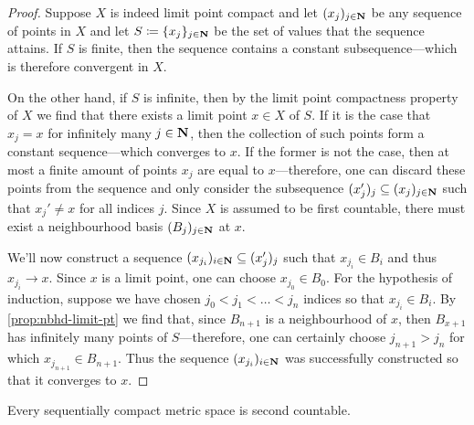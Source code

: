 \begin{proof}
    Suppose \(X\) is indeed limit point compact and let \((x_j)_{j \in \mathbf{N}}\) be any
    sequence of points in \(X\) and let \(S \coloneq \{x_j\}_{j \in \mathbf{N}}\) be the
    set of values that the sequence attains. If \(S\) is finite, then the sequence
    contains a constant subsequence---which is therefore convergent in \(X\).

    On the other hand, if \(S\) is infinite, then by the limit point compactness
    property of \(X\) we find that there exists a limit point \(x \in X\) of
    \(S\). If it is the case that \(x_j = x\) for infinitely many \(j \in \mathbf{N}\), then
    the collection of such points form a constant sequence---which converges to
    \(x\). If the former is not the case, then at most a finite amount of points
    \(x_j\) are equal to \(x\)---therefore, one can discard these points from the
    sequence and only consider the subsequence
    \((x_j')_j \subseteq (x_j)_{j \in \mathbf{N}}\) such that \(x_j' \neq x\) for all
    indices \(j\). Since \(X\) is assumed to be first countable, there must exist a
    neighbourhood basis \((B_j)_{j \in \mathbf{N}}\) at \(x\).

    We'll now construct a sequence \((x_{j_i})_{i \in \mathbf{N}} \subseteq (x_j')_j\) such
    that \(x_{j_i} \in B_i\) and thus \(x_{j_i} \to x\). Since \(x\) is a limit
    point, one can choose \(x_{j_0} \in B_0\). For the hypothesis of induction,
    suppose we have chosen \(j_0 < j_1 < \dots < j_n\) indices so that
    \(x_{j_i} \in B_i\). By \cref{prop:nbhd-limit-pt} we find that, since
    \(B_{n + 1}\) is a neighbourhood of \(x\), then \(B_{x + 1}\) has infinitely
    many points of \(S\)---therefore, one can certainly choose \(j_{n+1} > j_n\) for
    which \(x_{j_{n+1}} \in B_{n+1}\). Thus the sequence \((x_{j_i})_{i \in \mathbf{N}}\)
    was successfully constructed so that it converges to \(x\).
\end{proof}

\begin{lemma}
    \label{lem:metric-sequencially-comp-is-2nd-ctbl}
    Every sequentially compact metric space is second countable.
\end{lemma}

